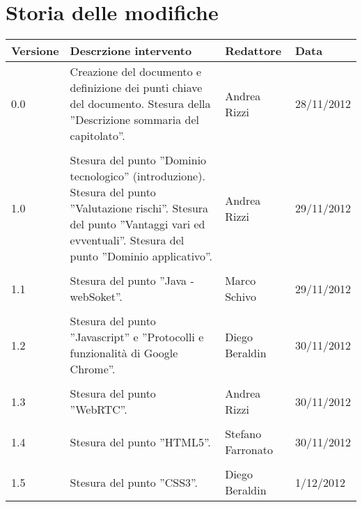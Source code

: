 \newcommand{\docName}{Studio di fattibilit{`a}}
\newcommand{\docFileName}{SF.tex}
\newcommand{\docVers}{1.4}
\newcommand{\creationDate}{}
\newcommand{\modificationDate}{}
\newcommand{\docState}{}
\newcommand{\docUsage}{}
\newcommand{\docAuthors}{}
\newcommand{\approvedBy}{}
\newcommand{\verifiedBy}{}
\newcommand{\docRoot}{..}







\section*{Storia delle modifiche}
\begin{tabularx}{\textwidth}{lXll}
\toprule
Versione & Descrzione intervento & Redattore & Data\\
\midrule %
0.0 & Creazione del documento e definizione dei punti chiave del documento. Stesura della ''Descrizione sommaria del capitolato''. & Andrea Rizzi & 28/11/2012\\\\
1.0 & Stesura del punto ''Dominio tecnologico'' (introduzione). Stesura del punto ''Valutazione rischi''. Stesura del punto ''Vantaggi vari ed evventuali''. Stesura del punto ''Dominio applicativo''.  & Andrea Rizzi & 29/11/2012\\\\
1.1 & Stesura del punto ''Java - webSoket''.  & Marco Schivo & 29/11/2012\\\\
1.2 & Stesura del punto ''Javascript'' e ''Protocolli e funzionalità di Google Chrome''.  & Diego Beraldin & 30/11/2012\\\\1.3 & Stesura del punto ''WebRTC''. & Andrea Rizzi & 30/11/2012\\\\1.4 & Stesura del punto ''HTML5''. & Stefano Farronato & 30/11/2012\\\\1.5 & Stesura del punto ''CSS3''. & Diego Beraldin & 1/12/2012\\
\bottomrule
\end{tabularx}
\newpage



\setcounter{page}{1}
\pagestyle{normal}





